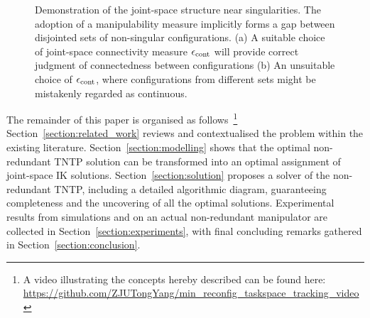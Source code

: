 \documentclass[letterpaper, 10 pt, conference]{ieeeconf}  %
\begin{document}
\begin{figure}[t]
\centering
{}
\caption{Demonstration of the joint-space structure near singularities. The adoption of a manipulability measure implicitly forms a gap between disjointed sets of non-singular configurations. (a) A suitable choice of joint-space connectivity measure $\epsilon_{\rm cont}$ will provide correct judgment of connectedness between configurations (b) An unsuitable choice of $\epsilon_{\rm cont}$, where configurations from different sets might be mistakenly regarded as continuous. }\label{fig:sing}
\end{figure}



The remainder of this paper is organised as follows~\footnote{A video illustrating the concepts hereby described can be found here: \url{https://github.com/ZJUTongYang/min_reconfig_taskspace_tracking_video}} 
Section~\ref{section:related_work} reviews and contextualised the problem within the existing literature. 
Section~\ref{section:modelling} shows that the optimal non-redundant TNTP solution can be transformed into an optimal assignment of joint-space IK solutions. 
Section~\ref{section:solution} proposes a solver of the non-redundant TNTP, including a detailed algorithmic diagram, guaranteeing completeness and the uncovering of all the optimal solutions. %
Experimental results from simulations and on an actual non-redundant manipulator are collected in Section~\ref{section:experiments}, with final concluding remarks gathered in Section~\ref{section:conclusion}.  
\end{document}

